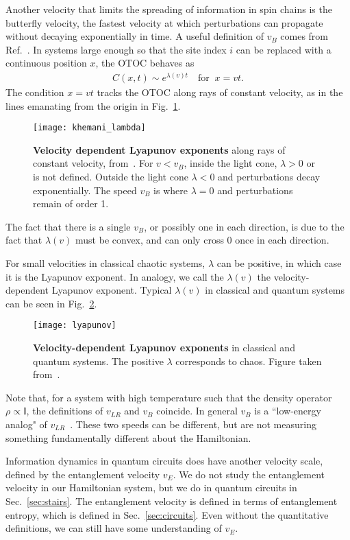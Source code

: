 Another velocity that limits the spreading of information in spin chains is the butterfly velocity, the fastest velocity at which perturbations can propagate without decaying exponentially in time. A useful definition of $v_B$ comes from Ref.~\cite{Khemani2018}. In systems large enough so that the site index $i$ can be replaced with a continuous position $x$, the OTOC behaves as~\cite{Khemani2018}
\begin{align}
C(x,t)\sim e^{\lambda(v)t}\quad\text{for}\;\;x=vt.\label{eqn:butterfly}
\end{align}
The condition $x=vt$ tracks the OTOC along rays of constant velocity, as in the lines emanating from the origin in Fig.~\ref{fig:khemani_lambda}.
\begin{figure}
	\centering
	\texttt{[image: khemani\_lambda]}
	\caption{\textbf{Velocity dependent Lyapunov exponents} along rays of constant velocity, from~\cite{Khemani2018}. For $v<v_B$, inside the light cone, $\lambda>0$ or is not defined. Outside the light cone $\lambda<0$ and perturbations decay exponentially. The speed $v_B$ is where $\lambda=0$ and perturbations remain of order 1.}
	\label{fig:khemani_lambda}
\end{figure}
The fact that there is a single $v_B$, or possibly one in each direction, is due to the fact that $\lambda(v)$ must be convex, and can only cross 0 once in each direction.

For small velocities in classical chaotic systems, $\lambda$ can be positive, in which case it is the Lyapunov exponent. In analogy, we call the $\lambda(v)$ the velocity-dependent Lyapunov exponent. Typical $\lambda(v)$ in classical and quantum systems can be seen in Fig.~\ref{fig:lyapunov}.
\begin{figure}
	\centering
	\texttt{[image: lyapunov]}
	\caption{\textbf{Velocity-dependent Lyapunov exponents} in classical and quantum systems. The positive $\lambda$ corresponds to chaos. Figure taken from~\cite{Khemani2018}.}
	\label{fig:lyapunov}
\end{figure}

Note that, for a system with high temperature such that the density operator $\rho\propto\mathbb{I}$, the definitions of $v_{LR}$ and $v_B$ coincide. In general $v_B$ is a ``low-energy analog" of $v_{LR}$~\cite{Roberts2016}. These two speeds can be different, but are not measuring something fundamentally different about the Hamiltonian.

Information dynamics in quantum circuits does have another velocity scale, defined by the entanglement velocity $v_E$. We do not study the entanglement velocity in our Hamiltonian system, but we do in quantum circuits in Sec.~\ref{sec:stairs}. The entanglement velocity is defined in terms of entanglement entropy, which is defined in Sec.~\ref{sec:circuits}. Even without the quantitative definitions, we can still have some understanding of $v_E$.

